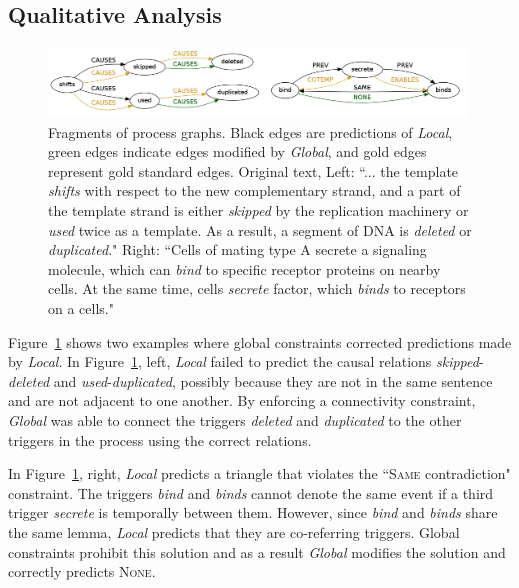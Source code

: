 \subsection{Qualitative Analysis} \label{subsec:analysis}

\begin{figure}[t]
\centering
\includegraphics[width=0.99\textwidth]{figures/example.png} 
\caption{Fragments of process graphs. Black edges are predictions of \emph{Local}, green edges indicate edges modified by \emph{Global}, and gold edges represent gold standard edges. Original text, Left: ``... the template \emph{shifts} with respect to the new complementary strand, and a part of the template strand is either \emph{skipped} by the replication machinery or \emph{used} twice as a template.
As a result, a segment of DNA is \emph{deleted} or \emph{duplicated}." Right: ``Cells of mating type A secrete a signaling molecule, which can \emph{bind} to specific receptor proteins on nearby cells. At the same time, cells \emph{secrete} factor, which \emph{binds} to receptors on a cells."}
\label{fig:graph}
\end{figure}

Figure~\ref{fig:graph} shows two examples where global constraints corrected predictions made by \emph{Local}. In Figure~\ref{fig:graph}, left, \emph{Local} failed to predict the causal relations \emph{skipped}-\emph{deleted} and \emph{used}-\emph{duplicated}, possibly because they are not in the same sentence and are not adjacent to one another. By enforcing a connectivity constraint, \emph{Global} was able to connect the triggers \emph{deleted} and \emph{duplicated} to the other triggers in the process using the correct relations.

In Figure~\ref{fig:graph}, right, \emph{Local} predicts a triangle that violates the ``\textsc{Same} contradiction" constraint. The triggers \emph{bind} and \emph{binds} cannot denote the same event if a third trigger \emph{secrete} is temporally between them. However, since \emph{bind} and \emph{binds} share the same lemma, \emph{Local} predicts that they are co-referring triggers. Global constraints prohibit this solution and as a result \emph{Global} modifies the solution and correctly predicts \textsc{None}.

